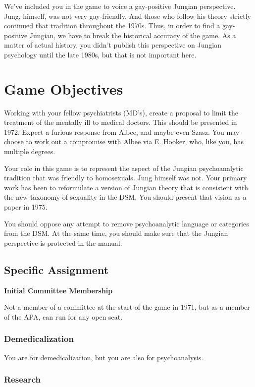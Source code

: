 \begin{refsection}
We've included you in the game to voice a gay-positive Jungian perspective. Jung, himself, was not very gay-friendly. And those who follow his theory strictly continued that tradition throughout the 1970s. Thus, in order to find a gay-positive Jungian, we have to break the historical accuracy of the game. As a matter of actual history, you didn't publish this perspective on Jungian psychology until the late 1980s, but that is not important here.

\section{Game Objectives}
\label{gameobjectives}

Working with your fellow psychiatrists (MD's), create a proposal to limit the treatment of the mentally ill to medical doctors. This should be presented in 1972. Expect a furious response from Albee, and maybe even Szasz. You may choose to work out a compromise with Albee via E. Hooker, who, like you, has multiple degrees.

Your role in this game is to represent the aspect of the Jungian psychoanalytic tradition that was friendly to homosexuals. Jung himself was not. Your primary work has been to reformulate a version of Jungian theory that is consistent with the new taxonomy of sexuality in the DSM. You should present that vision as a paper in 1975.

You should oppose any attempt to remove psychoanalytic language or categories from the DSM. At the same time, you should make sure that the Jungian perspective is protected in the manual.

\subsection{Specific Assignment}
\label{specificassignment}

\textbf{Initial Committee Membership}

Not a member of a committee at the start of the game in 1971, but as a member of the APA, can run for any open seat.

\subsubsection{Demedicalization}
\label{demedicalization}

You are for demedicalization, but you are also for psychoanalysis.

\subsubsection{Research}
\label{research}


\end{refsection}

